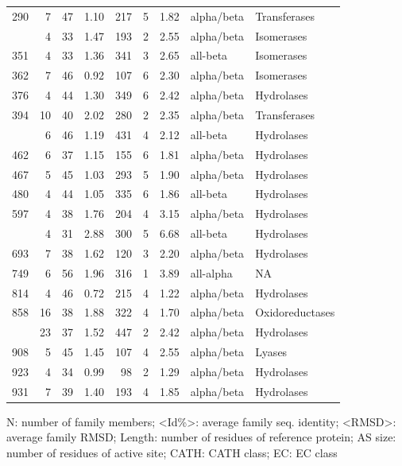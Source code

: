 \documentclass[
]{article}
\begin{document}
\begin{table}
{\begin{threeparttable}
\begin{tabular}[t]{rrrrrrrll}
290 & 7 & 47 & 1.10 & 217 & 5 & 1.82 & alpha/beta & Transferases\\
\addlinespace
328 & 4 & 33 & 1.47 & 193 & 2 & 2.55 & alpha/beta & Isomerases\\
351 & 4 & 33 & 1.36 & 341 & 3 & 2.65 & all-beta & Isomerases\\
362 & 7 & 46 & 0.92 & 107 & 6 & 2.30 & alpha/beta & Isomerases\\
376 & 4 & 44 & 1.30 & 349 & 6 & 2.42 & alpha/beta & Hydrolases\\
394 & 10 & 40 & 2.02 & 280 & 2 & 2.35 & alpha/beta & Transferases\\
\addlinespace
444 & 6 & 46 & 1.19 & 431 & 4 & 2.12 & all-beta & Hydrolases\\
462 & 6 & 37 & 1.15 & 155 & 6 & 1.81 & alpha/beta & Hydrolases\\
467 & 5 & 45 & 1.03 & 293 & 5 & 1.90 & alpha/beta & Hydrolases\\
480 & 4 & 44 & 1.05 & 335 & 6 & 1.86 & all-beta & Hydrolases\\
597 & 4 & 38 & 1.76 & 204 & 4 & 3.15 & alpha/beta & Hydrolases\\
\addlinespace
681 & 4 & 31 & 2.88 & 300 & 5 & 6.68 & all-beta & Hydrolases\\
693 & 7 & 38 & 1.62 & 120 & 3 & 2.20 & alpha/beta & Hydrolases\\
749 & 6 & 56 & 1.96 & 316 & 1 & 3.89 & all-alpha & NA\\
814 & 4 & 46 & 0.72 & 215 & 4 & 1.22 & alpha/beta & Hydrolases\\
858 & 16 & 38 & 1.88 & 322 & 4 & 1.70 & alpha/beta & Oxidoreductases\\
\addlinespace
877 & 23 & 37 & 1.52 & 447 & 2 & 2.42 & alpha/beta & Hydrolases\\
908 & 5 & 45 & 1.45 & 107 & 4 & 2.55 & alpha/beta & Lyases\\
923 & 4 & 34 & 0.99 & 98 & 2 & 1.29 & alpha/beta & Hydrolases\\
931 & 7 & 39 & 1.40 & 193 & 4 & 1.85 & alpha/beta & Hydrolases\\
\bottomrule
\end{tabular}
\begin{tablenotes}
\item N: number of family members; <Id\%>: average family seq. identity; <RMSD>: average family RMSD; Length: number of residues of reference protein; AS size: number of residues of active site; CATH: CATH class; EC: EC class
\end{tablenotes}
\end{threeparttable}}
\end{table}
\end{document}
